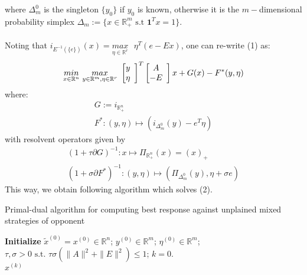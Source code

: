 \documentclass[a4paper,10pt,journal]{IEEEtran}
\begin{document}
where $\Delta_{m}^0$ is the singleton $\{y_0\}$ if $y_0$ is known, otherwise it is the $m-$dimensional probability simplex $\Delta_{m} := \{x \in \mathbb{R}_{+}^m \text{ s.t }\textbf{1}^Tx = 1\}$.\\\\
Noting that $i_{E^{-1}(\{e\})}(x) = \underset{\eta \in \mathbb{R}^r}{max}\text{ }\eta^T(e - Ex)$, one can re-write (1) as:
\begin{equation}
  \underset{x \in \mathbb{R}^n}{min}\text{ }\underset{y \in \mathbb{R}^m, \eta \in \mathbb{R}^r}{max}\text{ }\left[ \begin{array}{@{}cc@{}}
    y \\
    \eta
    \end{array} \right]^T\left[ \begin{array}{@{}cc@{}}
    A \\
    -E
    \end{array} \right]x + G(x) - F^*(y, \eta)
\end{equation}
where:
\begin{equation}
  \begin{aligned}
    G:=i_{\mathbb{R}_{+}^n}\\
    F^*: (y, \eta) \mapsto (i_{\Delta_{m}^0}(y) - e^T\eta)
  \end{aligned}
\end{equation}
with resolvent operators given by
\begin{equation}
  \begin{aligned}
    (1 + \tau \partial G)^{-1}: x \mapsto \Pi_{\mathbb{R}_{+}^n}(x) = (x)_+\\
    (1 + \sigma \partial F^*)^{-1}: (y, \eta) \mapsto (\Pi_{\Delta_{m}^0}(y), \eta + \sigma e)%
  \end{aligned}
\end{equation}
This way, we obtain following algorithm which solves (2).

\begin{algorithm}[htb]
\caption{Primal-dual algorithm for computing best response against unplained mixed strategies of opponent}%
\textbf{Initialize} $\tilde{x}^{(0)} = x^{(0)} \in \mathbb{R}^n$; $y^{(0)} \in \mathbb{R}^{m}$; $\eta^{(0)} \in \mathbb{R}^{m}$;
$\tau, \sigma > 0 \text{ s.t. }\tau\sigma (\|A\|^2 + \|E\|^2) \le 1$; $k = 0$.\\
 \Return $x^{(k)}$
\label{Tab:pseudocode_lbfgs}
\end{algorithm}
\end{document}
